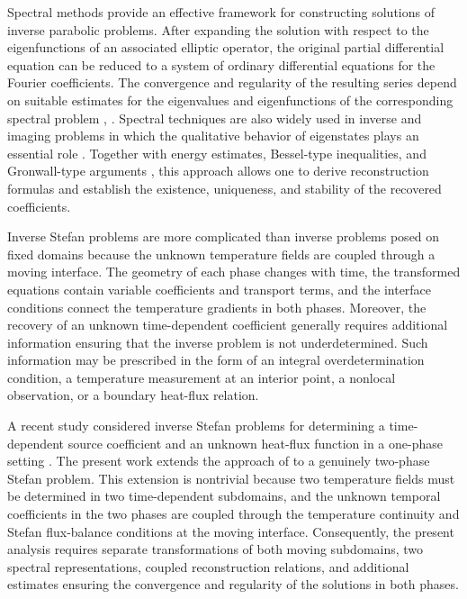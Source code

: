 \documentclass[preprint,12pt,authoryear]{elsarticle}
\begin{document}
Spectral methods provide an effective framework for constructing solutions of inverse parabolic problems. After expanding the solution with respect to the eigenfunctions of an associated elliptic operator, the original partial differential equation can be reduced to a system of ordinary differential equations for the Fourier coefficients. The convergence and regularity of the resulting series depend on suitable estimates for the eigenvalues and eigenfunctions of the corresponding spectral problem \cite{1}, \cite{10}. Spectral techniques are also widely used in inverse and imaging problems
in which the qualitative behavior of eigenstates plays an essential role \cite{6}. Together with energy estimates, Bessel-type inequalities, and Gronwall-type arguments \cite{17}, this approach allows one to derive reconstruction formulas and establish the existence, uniqueness, and stability of the recovered coefficients.

Inverse Stefan problems are more complicated than inverse problems posed on fixed domains because the unknown temperature fields are coupled through a moving interface. The geometry of each phase changes with time, the transformed equations contain variable coefficients and transport terms, and the interface conditions connect the temperature gradients in both phases. Moreover, the recovery of an unknown time-dependent coefficient generally requires additional information ensuring that the inverse problem is not underdetermined. Such information may be prescribed in the form of an integral overdetermination condition, a temperature measurement at an interior point, a nonlocal observation, or a boundary heat-flux relation.

A recent study considered inverse Stefan problems for determining a time-dependent source coefficient and an unknown heat-flux function in a one-phase setting \cite{20}. The present work extends the approach of \cite{20} to a genuinely two-phase Stefan problem. This extension is nontrivial because two temperature fields must be determined in two time-dependent subdomains, and the unknown temporal coefficients in the two phases are coupled through the temperature continuity and Stefan flux-balance conditions at the moving interface. Consequently, the present analysis requires separate transformations of both moving subdomains, two spectral
representations, coupled reconstruction relations, and additional estimates  ensuring the convergence and regularity of the solutions in both phases.
\end{document}
